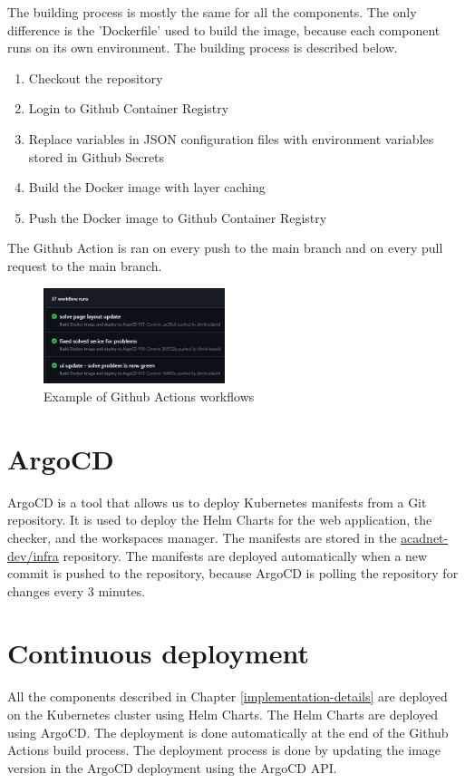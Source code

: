 \documentclass[12pt,a4paper]{report}
\begin{document}
The building process is mostly the same for all the components. The only difference is the 'Dockerfile' used to build the image, because each component runs on its own environment. The building process is described below.

\begin{enumerate}
	\item Checkout the repository
	\item Login to Github Container Registry
	\item Replace variables in JSON configuration files with environment variables stored in Github Secrets
	\item Build the Docker image with layer caching
	\item Push the Docker image to Github Container Registry
\end{enumerate}

The Github Action is ran on every push to the main branch and on every pull request to the main branch.

\begin{figure}[h]
	\centering
	\includegraphics[width=200px]{./pics/github-actions-workflows.png}
	\caption{Example of Github Actions workflows}
	\label{fig:github-actions-workflows}
\end{figure}

\section{ArgoCD}
ArgoCD is a tool that allows us to deploy Kubernetes manifests from a Git repository. It is used to deploy the Helm Charts for the web application, the checker, and the workspaces manager. The manifests are stored in the \href{https://github.com/acadnet-dev/infra}{acadnet-dev/infra} repository. The manifests are deployed automatically when a new commit is pushed to the repository, because ArgoCD is polling the repository for changes every 3 minutes.


\section{Continuous deployment}
All the components described in Chapter \ref{implementation-details} are deployed on the Kubernetes cluster using Helm Charts. The Helm Charts are deployed using ArgoCD. The deployment is done automatically at the end of the Github Actions build process. The deployment process is done by updating the image version in the ArgoCD deployment using the ArgoCD API.
\end{document}
